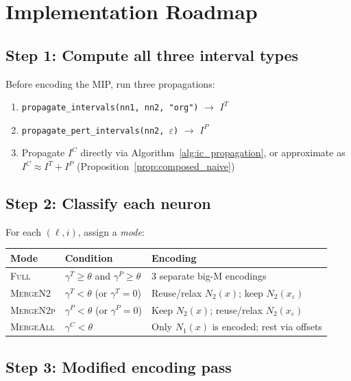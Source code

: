 \documentclass[11pt]{article}
\newcommand{\layerl}{\ell}
\begin{document}
\section{Implementation Roadmap}
\label{sec:roadmap}

\subsection{Step 1: Compute all three interval types}

Before encoding the MIP, run three propagations:
\begin{enumerate}
    \item \texttt{propagate\_intervals(nn1, nn2, "org")} $\to$ $I^T$
    \item \texttt{propagate\_pert\_intervals(nn2, $\varepsilon$)} $\to$ $I^P$
    \item Propagate $I^C$ directly via Algorithm~\ref{alg:ic_propagation},
          or approximate as $I^C \approx I^T + I^P$ (Proposition~\ref{prop:composed_naive})
\end{enumerate}

\subsection{Step 2: Classify each neuron}

For each $(\layerl, i)$, assign a \emph{mode}:
\begin{center}
\renewcommand{\arraystretch}{1.3}
\begin{tabular}{l|l|l}
\textbf{Mode} & \textbf{Condition} & \textbf{Encoding} \\
\hline
\textsc{Full}    & $\gamma^T \ge \theta$ and $\gamma^P \ge \theta$
                 & 3 separate big-M encodings \\
\textsc{MergeN2} & $\gamma^T < \theta$ (or $\gamma^T = 0$)
                 & Reuse/relax $N_2(x)$; keep $N_2(x_\varepsilon)$ \\
\textsc{MergeN2p} & $\gamma^P < \theta$ (or $\gamma^P = 0$)
                  & Keep $N_2(x)$; reuse/relax $N_2(x_\varepsilon)$ \\
\textsc{MergeAll} & $\gamma^C < \theta$
                  & Only $N_1(x)$ is encoded; rest via offsets
\end{tabular}
\end{center}

\subsection{Step 3: Modified encoding pass}
\end{document}
